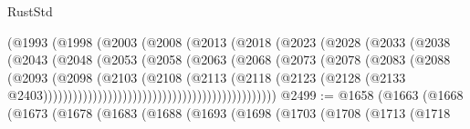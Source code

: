 \begin{lexlean}{RustStd}
\begin{coremodule}
                                        (@1993
                                          (@1998
                                            (@2003
                                              (@2008
                                                (@2013
                                                  (@2018
                                                    (@2023
                                                      (@2028
                                                        (@2033
                                                          (@2038
                                                            (@2043
                                                              (@2048
                                                                (@2053
                                                                  (@2058
                                                                    (@2063
                                                                      (@2068
                                                                        (@2073
                                                                          (@2078
                                                                            (@2083
                                                                              (@2088
                                                                                (@2093
                                                                                  (@2098
                                                                                    (@2103
                                                                                      (@2108
                                                                                        (@2113
                                                                                          (@2118
                                                                                            (@2123
                                                                                              (@2128
                                                                                                (@2133
                                                                                                  @2403)))))))))))))))))))))))))))))))))))))))))))))))
@2499 := @1658
    (@1663
      (@1668
        (@1673
          (@1678
            (@1683
              (@1688
                (@1693
                  (@1698
                    (@1703
                      (@1708
                        (@1713
                          (@1718

\end{coremodule}
\end{lexlean}
